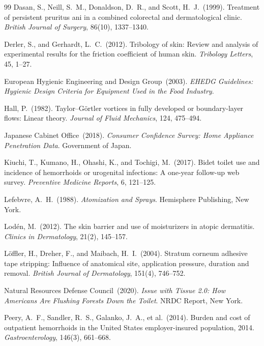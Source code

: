\documentclass[aps,prfluids,reprint,amsmath,amssymb,floatfix]{revtex4-2}
\begin{document}
\begin{thebibliography}{99}
Dasan, S., Neill, S.~M., Donaldson, D.~R., and Scott, H.~J.\ (1999).
Treatment of persistent pruritus ani in a combined colorectal and
dermatological clinic.
\textit{British Journal of Surgery}, 86(10), 1337--1340.

Derler, S., and Gerhardt, L.~C.\ (2012).
Tribology of skin: Review and analysis of experimental results for the
friction coefficient of human skin.
\textit{Tribology Letters}, 45, 1--27.

European Hygienic Engineering and Design Group\ (2003).
\textit{EHEDG Guidelines: Hygienic Design Criteria for Equipment Used in
the Food Industry}.

Hall, P.\ (1982).
Taylor--G\"{o}rtler vortices in fully developed or boundary-layer flows:
Linear theory.
\textit{Journal of Fluid Mechanics}, 124, 475--494.

Japanese Cabinet Office\ (2018).
\textit{Consumer Confidence Survey: Home Appliance Penetration Data}.
Government of Japan.

Kiuchi, T., Kumano, H., Ohashi, K., and Tochigi, M.\ (2017).
Bidet toilet use and incidence of hemorrhoids or urogenital infections:
A one-year follow-up web survey.
\textit{Preventive Medicine Reports}, 6, 121--125.

Lefebvre, A.~H.\ (1988).
\textit{Atomization and Sprays}.
Hemisphere Publishing, New York.

Lod\'{e}n, M.\ (2012).
The skin barrier and use of moisturizers in atopic dermatitis.
\textit{Clinics in Dermatology}, 21(2), 145--157.

L\"{o}ffler, H., Dreher, F., and Maibach, H.~I.\ (2004).
Stratum corneum adhesive tape stripping: Influence of anatomical site,
application pressure, duration and removal.
\textit{British Journal of Dermatology}, 151(4), 746--752.

Natural Resources Defense Council\ (2020).
\textit{Issue with Tissue 2.0: How Americans Are Flushing Forests Down
the Toilet}.
NRDC Report, New York.

Peery, A.~F., Sandler, R.~S., Galanko, J.~A., et al.\ (2014).
Burden and cost of outpatient hemorrhoids in the United States
employer-insured population, 2014.
\textit{Gastroenterology}, 146(3), 661--668.


\end{thebibliography}
\end{document}
